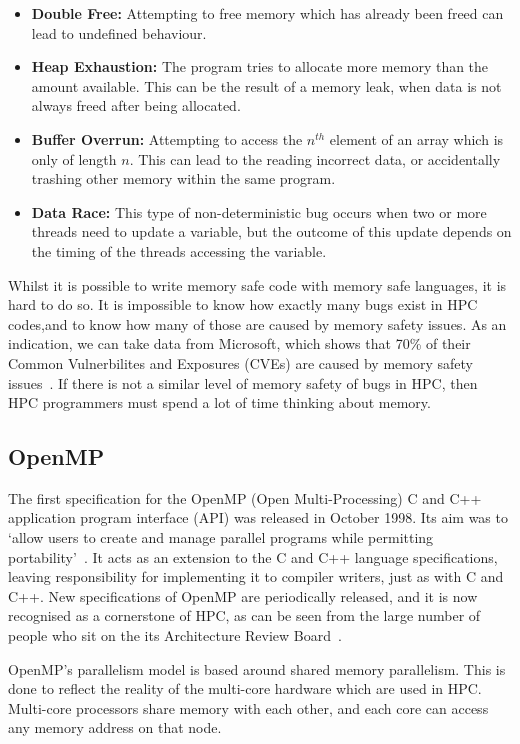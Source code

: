 \begin{itemize}
    \item \textbf{Double Free:} Attempting to free memory which has already been freed can lead to undefined behaviour.
    \item \textbf{Heap Exhaustion:} The program tries to allocate more memory than the amount available. This can be the result of a memory leak, when data is not always freed after being allocated.
    \item \textbf{Buffer Overrun:} Attempting to access the $n^{th}$ element of an array which is only of length $n$. This can lead to the reading incorrect data, or accidentally trashing other memory within the same program.
    \item \textbf{Data Race:} This type of non-deterministic bug occurs when two or more threads need to update a variable, but the outcome of this update depends on the timing of the threads accessing the variable. 
\end{itemize}

Whilst it is possible to write memory safe code with memory safe languages, it is hard to do so. It is impossible to know how exactly many bugs exist in HPC codes,and to know how many of those are caused by memory safety issues.
As an indication, we can take data from Microsoft, which shows that 70\% of their Common Vulnerbilites and Exposures (CVEs) are caused by memory safety issues~\cite{MicroBugs}. If there is not a similar level of memory safety of bugs in HPC, then HPC programmers must spend a lot of time thinking about memory.

\subsection{OpenMP}
The first specification for the OpenMP (Open Multi-Processing) C and C++ application program interface (API) was released in October 1998. Its aim was to `allow users to create and manage parallel programs while permitting portability'~\cite{OpenMPSpec}. It acts as an extension to the C and C++ language specifications, leaving responsibility for implementing it to compiler writers, just as with C and C++. New specifications of OpenMP are periodically released, and it is now recognised as a cornerstone of HPC, as can be seen from the large number of people who sit on the its Architecture Review Board~\cite{OpenMPARB}.

OpenMP's parallelism model is based around shared memory parallelism. This is done to reflect the reality of the multi-core hardware which are used in HPC. Multi-core processors share memory with each other, and each core can access any memory address on that node.  

